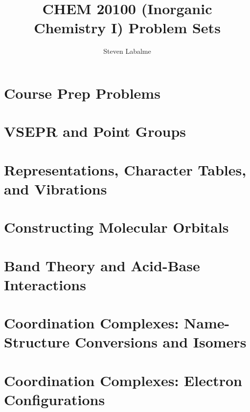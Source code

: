 \documentclass[titlepage]{article}
\title{CHEM 20100 (Inorganic Chemistry I) Problem Sets}
\author{Steven Labalme}
\begin{document}
\maketitle



\tableofcontents
\newpage



\pagestyle{main}
\renewcommand{\leftmark}{Problem Set \thesection}
\setcounter{section}{-1}
\section{Course Prep Problems}

\newpage



\section{VSEPR and Point Groups}

\newpage



\section{Representations, Character Tables, and Vibrations}

\newpage



\section{Constructing Molecular Orbitals}

\newpage



\section{Band Theory and Acid-Base Interactions}

\newpage



\section{Coordination Complexes: Name-Structure Conversions and Isomers}

\newpage



\section{Coordination Complexes: Electron Configurations}

\end{document}
